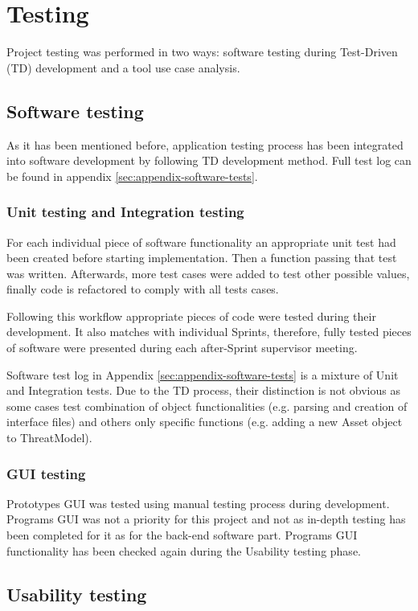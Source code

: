 \section{Testing}\label{testing}
Project testing was performed in two ways: software testing during Test-Driven (TD) development and a tool use case analysis. 

\subsection{Software testing}
	As it has been mentioned before, application testing process has been integrated into software development by following TD development method. Full test log can be found in appendix \ref{sec:appendix-software-tests}.

	\subsubsection{Unit testing and Integration testing}
	For each individual piece of software functionality an appropriate unit test had been created before starting implementation. Then a function passing that test was written. Afterwards, more test cases were added to test other possible values, finally code is refactored to comply with all tests cases.
	
	Following this workflow appropriate pieces of code were tested during their development. It also matches with individual Sprints, therefore, fully tested pieces of software were presented during each after-Sprint supervisor meeting.
	
	Software test log in Appendix \ref{sec:appendix-software-tests} is a mixture of Unit and Integration tests. Due to the TD process, their distinction is not obvious as some cases test combination of object functionalities (e.g. parsing and creation of interface files) and others only specific functions (e.g. adding a new Asset object to ThreatModel).


	\subsubsection{GUI testing}
	Prototypes GUI was tested using manual testing process during development. Programs GUI was not a priority for this project and not as in-depth testing has been completed for it as for the back-end software part. Programs GUI functionality has been checked again during the Usability testing phase.


\subsection{Usability testing}

